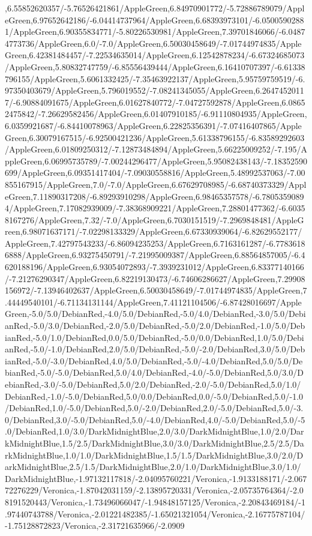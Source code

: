 {\begin{tikzternal}
,6.55852620357/-5.76526421861/AppleGreen,6.84970901772/-5.72886789079/AppleGreen,6.97652642186/-6.04414737964/AppleGreen,6.68393973101/-6.05005902881/AppleGreen,6.90355834771/-5.80226530981/AppleGreen,7.39701846066/-6.04874773736/AppleGreen,6.0/-7.0/AppleGreen,6.50030458649/-7.01744974835/AppleGreen,6.42381484457/-7.22534635014/AppleGreen,6.12542878234/-6.67324685073/AppleGreen,5.80832747759/-6.85556439444/AppleGreen,6.16410707397/-6.61338796155/AppleGreen,5.6061332425/-7.35463922137/AppleGreen,5.95759759519/-6.97350403679/AppleGreen,5.796019552/-7.08241345055/AppleGreen,6.26474520117/-6.90884091675/AppleGreen,6.01627840772/-7.04727592878/AppleGreen,6.08652475842/-7.26629582456/AppleGreen,6.01407910185/-6.91110804935/AppleGreen,6.0359921687/-6.84410078963/AppleGreen,6.22825356391/-7.07416407865/AppleGreen,6.30079167515/-6.92500421236/AppleGreen,5.61338796155/-6.83589292603/AppleGreen,6.01809250312/-7.12873484894/AppleGreen,5.66225009252/-7.195/AppleGreen,6.06995735789/-7.00244296477/AppleGreen,5.95082438143/-7.18352590699/AppleGreen,6.09351417404/-7.09030558816/AppleGreen,5.48992537063/-7.00855167915/AppleGreen,7.0/-7.0/AppleGreen,6.67629708985/-6.68740373329/AppleGreen,7.11890317208/-6.89293910298/AppleGreen,6.98465357578/-6.78053590894/AppleGreen,7.17082939009/-7.38368909221/AppleGreen,7.28801477362/-6.60358167276/AppleGreen,7.32/-7.0/AppleGreen,6.7030151519/-7.2969848481/AppleGreen,6.98071637171/-7.02298133329/AppleGreen,6.67330939064/-6.82629552177/AppleGreen,7.42797543233/-6.86094235253/AppleGreen,6.7163161287/-6.77836186888/AppleGreen,6.93275450791/-7.21995009387/AppleGreen,6.88564857005/-6.4620188196/AppleGreen,6.93054072893/-7.3939231012/AppleGreen,6.83377140166/-7.21276290347/AppleGreen,6.82219130473/-6.74606286627/AppleGreen,7.29908156972/-7.13946402637/AppleGreen,6.50030458649/-7.01744974835/AppleGreen,7.44449540101/-6.71134131144/AppleGreen,7.41121104506/-6.87428016697/AppleGreen,-5.0/5.0/DebianRed,-4.0/5.0/DebianRed,-5.0/4.0/DebianRed,-3.0/5.0/DebianRed,-5.0/3.0/DebianRed,-2.0/5.0/DebianRed,-5.0/2.0/DebianRed,-1.0/5.0/DebianRed,-5.0/1.0/DebianRed,0.0/5.0/DebianRed,-5.0/0.0/DebianRed,1.0/5.0/DebianRed,-5.0/-1.0/DebianRed,2.0/5.0/DebianRed,-5.0/-2.0/DebianRed,3.0/5.0/DebianRed,-5.0/-3.0/DebianRed,4.0/5.0/DebianRed,-5.0/-4.0/DebianRed,5.0/5.0/DebianRed,-5.0/-5.0/DebianRed,5.0/4.0/DebianRed,-4.0/-5.0/DebianRed,5.0/3.0/DebianRed,-3.0/-5.0/DebianRed,5.0/2.0/DebianRed,-2.0/-5.0/DebianRed,5.0/1.0/DebianRed,-1.0/-5.0/DebianRed,5.0/0.0/DebianRed,0.0/-5.0/DebianRed,5.0/-1.0/DebianRed,1.0/-5.0/DebianRed,5.0/-2.0/DebianRed,2.0/-5.0/DebianRed,5.0/-3.0/DebianRed,3.0/-5.0/DebianRed,5.0/-4.0/DebianRed,4.0/-5.0/DebianRed,5.0/-5.0/DebianRed,1.0/3.0/DarkMidnightBlue,2.0/3.0/DarkMidnightBlue,1.0/2.0/DarkMidnightBlue,1.5/2.5/DarkMidnightBlue,3.0/3.0/DarkMidnightBlue,2.5/2.5/DarkMidnightBlue,1.0/1.0/DarkMidnightBlue,1.5/1.5/DarkMidnightBlue,3.0/2.0/DarkMidnightBlue,2.5/1.5/DarkMidnightBlue,2.0/1.0/DarkMidnightBlue,3.0/1.0/DarkMidnightBlue,-1.97132117818/-2.04095760221/Veronica,-1.9133188171/-2.06772276229/Veronica,-1.87042031159/-2.13895720331/Veronica,-2.05735764364/-2.08191520443/Veronica,-1.73496066047/-1.94848157125/Veronica,-2.20843469184/-1.97440743788/Veronica,-2.01221482385/-1.65021321054/Veronica,-2.16775787104/-1.75128872823/Veronica,-2.31721635966/-2.0909
\end{tikzternal}}
